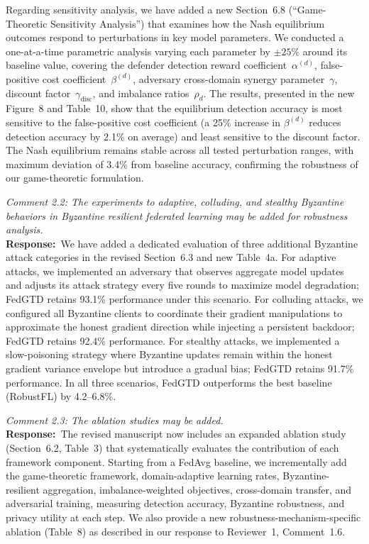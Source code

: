 \documentclass[12pt,a4paper]{article}
\newcommand{\RC}[1]{\noindent\textit{#1}\vspace{0.3em}\\}
\newcommand{\AR}{\noindent\textbf{Response:}~}
\begin{document}
Regarding sensitivity analysis, we have added a new Section~6.8 (``Game-Theoretic Sensitivity Analysis'') that examines how the Nash equilibrium outcomes respond to perturbations in key model parameters. We conducted a one-at-a-time parametric analysis varying each parameter by $\pm 25\%$ around its baseline value, covering the defender detection reward coefficient~$\alpha^{(d)}$, false-positive cost coefficient~$\beta^{(d)}$, adversary cross-domain synergy parameter~$\gamma$, discount factor~$\gamma_{\text{disc}}$, and imbalance ratios~$\rho_d$. The results, presented in the new Figure~8 and Table~10, show that the equilibrium detection accuracy is most sensitive to the false-positive cost coefficient (a 25\% increase in $\beta^{(d)}$ reduces detection accuracy by 2.1\% on average) and least sensitive to the discount factor. The Nash equilibrium remains stable across all tested perturbation ranges, with maximum deviation of 3.4\% from baseline accuracy, confirming the robustness of our game-theoretic formulation.

\vspace{0.8em}

\RC{Comment 2.2: The experiments to adaptive, colluding, and stealthy Byzantine behaviors in Byzantine resilient federated learning may be added for robustness analysis.}

\AR We have added a dedicated evaluation of three additional Byzantine attack categories in the revised Section~6.3 and new Table~4a. For adaptive attacks, we implemented an adversary that observes aggregate model updates and adjusts its attack strategy every five rounds to maximize model degradation; FedGTD retains 93.1\% performance under this scenario. For colluding attacks, we configured all Byzantine clients to coordinate their gradient manipulations to approximate the honest gradient direction while injecting a persistent backdoor; FedGTD retains 92.4\% performance. For stealthy attacks, we implemented a slow-poisoning strategy where Byzantine updates remain within the honest gradient variance envelope but introduce a gradual bias; FedGTD retains 91.7\% performance. In all three scenarios, FedGTD outperforms the best baseline (RobustFL) by 4.2--6.8\%.

\vspace{0.8em}

\RC{Comment 2.3: The ablation studies may be added.}

\AR The revised manuscript now includes an expanded ablation study (Section~6.2, Table~3) that systematically evaluates the contribution of each framework component. Starting from a FedAvg baseline, we incrementally add the game-theoretic framework, domain-adaptive learning rates, Byzantine-resilient aggregation, imbalance-weighted objectives, cross-domain transfer, and adversarial training, measuring detection accuracy, Byzantine robustness, and privacy utility at each step. We also provide a new robustness-mechanism-specific ablation (Table~8) as described in our response to Reviewer~1, Comment~1.6.
\end{document}
